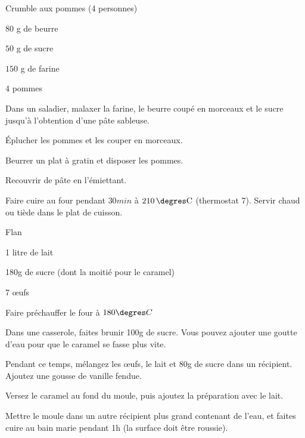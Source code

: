 \begin{recette}{Crumble aux pommes (4 personnes)}
\begin{ingredients}
\item $80$ g de beurre
\item $50$ g de sucre
\item $150$ g de farine
\item $4$ pommes
\end{ingredients}

\begin{preparation}
\item Dans un saladier, malaxer la farine, le beurre coupé en morceaux et le sucre jusqu'à l'obtention d'une pâte sableuse.
\item Éplucher les pommes et les couper en morceaux.
\item Beurrer un plat à gratin et disposer les pommes.
\item Recouvrir de pâte en l'émiettant.
\end{preparation}

\begin{cuisson}
Faire cuire au four pendant $30\unit{min}$ à $210\unit{\degres C}$ (thermostat 7). Servir chaud ou tiède dans le plat de cuisson.
\end{cuisson}

\end{recette}

\begin{recette}{Flan}
\begin{ingredients}
\item 1 litre de lait
\item 180g de sucre (dont la moitié pour le caramel)
\item 7 œufs
\end{ingredients}

\begin{preparation}
\item Faire préchauffer le four à $180\degres C$
\item Dans une casserole, faites brunir 100g de sucre. Vous pouvez ajouter une goutte d'eau pour que le caramel se fasse plus vite.
\item Pendant ce temps, mélangez les œufs, le lait et 80g de sucre dans un récipient. Ajoutez une gousse de vanille fendue.
\item Versez le caramel au fond du moule, puis ajoutez la préparation avec le lait.
\end{preparation}

\begin{cuisson}
Mettre le moule dans un autre récipient plus grand contenant de l'eau, et faites cuire au bain marie pendant 1h (la surface doit être roussie).
\end{cuisson}
\end{recette}

